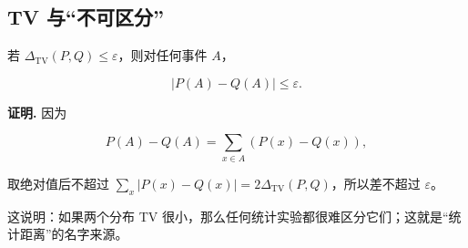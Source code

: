 \subsection{TV 与“不可区分”}


若 $\Delta_{\mathrm{TV}}(P,Q)\le\varepsilon$，则对任何事件 $A$，

\[
|P(A)-Q(A)|\le\varepsilon.
\]

\textbf{证明.} 因为

\[
P(A)-Q(A)=\sum_{x\in A}(P(x)-Q(x)),
\]

取绝对值后不超过 $\sum_x|P(x)-Q(x)|=2\Delta_{\mathrm{TV}}(P,Q)$，所以差不超过 $\varepsilon$。

这说明：如果两个分布 TV 很小，那么任何统计实验都很难区分它们；这就是“统计距离”的名字来源。
